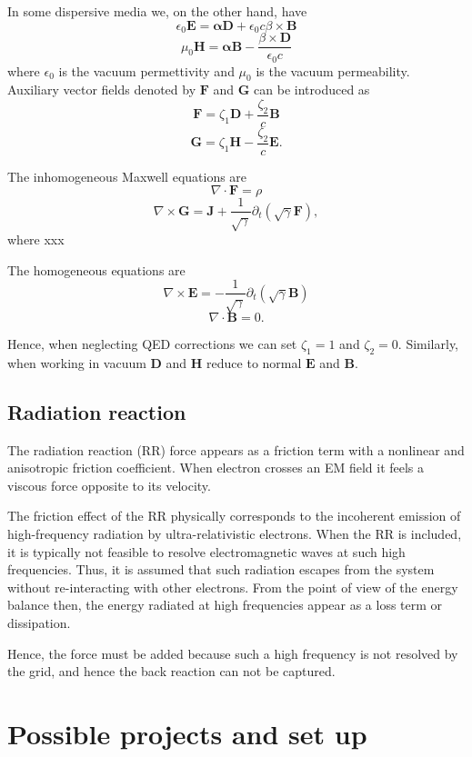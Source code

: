 \documentclass{aa}
\newcommand{\be}{\begin{equation}}
\newcommand{\ee}{\end{equation}}
\renewcommand{\vec}[1]{\ensuremath{\boldsymbol{#1}}}
\begin{document}
In some dispersive media we, on the other hand, have
\be
\epsilon_0 \vec{E} = \vec{\alpha} \vec{D} + \epsilon_0 c \beta \times \vec{B}
\ee
\be
\mu_0 \vec{H} = \vec{\alpha} \vec{B} - \frac{\beta \times \vec{D}}{\epsilon_0 c}
\ee
where $\epsilon_0$ is the vacuum permettivity and $\mu_0$ is the vacuum permeability.
Auxiliary vector fields denoted by $\vec{F}$ and $\vec{G}$ can be introduced as
\be
\vec{F} = \zeta_1 \vec{D} + \frac{\zeta_2}{c} \vec{B}
\ee
\be
\vec{G} = \zeta_1 \vec{H} - \frac{\zeta_2}{c} \vec{E}.
\ee

The inhomogeneous Maxwell equations are
\be
\nabla \cdot \vec{F} = \rho
\ee
\be
\nabla \times \vec{G} = \vec{J} + \frac{1}{\sqrt{\gamma}} \partial_t (\sqrt{\gamma} \vec{F}),
\ee
where xxx

The homogeneous equations are
\be
\nabla \times \vec{E} = -\frac{1}{\sqrt{\gamma}} \partial_t (\sqrt{\gamma} \vec{B})\ee
\be
\nabla \cdot \vec{B} = 0.
\ee

Hence, when neglecting QED corrections we can set $\zeta_1=1$ and $\zeta_2=0$.
Similarly, when working in vacuum $\vec{D}$ and $\vec{H}$ reduce to normal $\vec{E}$ and $\vec{B}$.



\subsection{Radiation reaction}

The radiation reaction (RR) force appears as a friction term with a nonlinear and anisotropic friction coefficient. 
When electron crosses an EM field it feels a viscous force opposite to its velocity.

The friction effect of the RR physically corresponds to the incoherent emission of high-frequency radiation by ultra-relativistic electrons.
When the RR is included, it is typically not feasible to resolve electromagnetic waves at such high frequencies.
Thus, it is assumed that such radiation escapes from the system without re-interacting with other electrons.
From the point of view of the energy balance then, the energy radiated at high frequencies appear as a loss term or dissipation.

Hence, the force must be added because such a high frequency is not resolved by the grid, and hence the back reaction can not be captured.




\section{Possible projects and set up}
\end{document}
